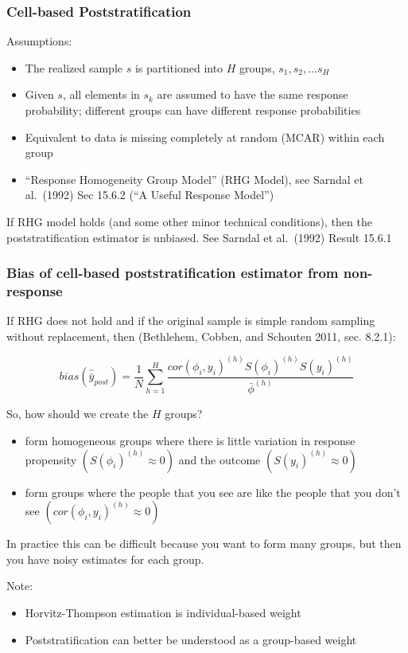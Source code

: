 \documentclass[aspectratio=169]{beamer}
\begin{document}
\begin{frame}
\frametitle{Cell-based Poststratification}

Assumptions:
\begin{itemize}
\item The realized sample $s$ is partitioned into $H$ groups, $s_1, s_2, \ldots s_H$
\item Given $s$, all elements in $s_k$ are assumed to have the same response probability; different groups can have different response probabilities
\item Equivalent to data is missing completely at random (MCAR) within each group
\item ``Response Homogeneity Group Model'' (RHG Model), see Sarndal et al.\ (1992) Sec 15.6.2 (``A Useful Response Model'')
\end{itemize}

\vfill
If RHG model holds (and some other minor technical conditions), then the poststratification estimator is unbiased.  See Sarndal et al.\ (1992) Result 15.6.1 

\end{frame}
\begin{frame}
\frametitle{Bias of cell-based poststratification estimator from non-response}

If RHG does not hold and if the original sample is simple random sampling without replacement, then (Bethlehem, Cobben, and Schouten 2011, sec. 8.2.1):

$$bias(\hat{\bar{y}}_{post}) = \frac{1}{N} \sum_{h=1}^H \frac{cor(\phi_i, y_i)^{(h)} S(\phi_i)^{(h)} S(y_i)^{(h)}}{\bar{\phi}^{(h)}}$$

So, how should we create the $H$ groups? \pause
\begin{itemize}
\item form homogeneous groups where there is little variation in response propensity $(S(\phi_i)^{(h)} \approx 0)$ and the outcome $(S(y_i)^{(h)} \approx 0)$ \pause
\item form groups where the people that you see are like the people that you don't see $(cor(\phi_i, y_i)^{(h)} \approx 0)$
\end{itemize}

\vfill
In practice this can be difficult because you want to form many groups, but then you have noisy estimates for each group.

\end{frame}
\begin{frame}

Note:
\begin{itemize}
\item Horvitz-Thompson estimation is individual-based weight
\item Poststratification can better be understood as a group-based weight
\end{itemize}

\end{frame}
\end{document}
